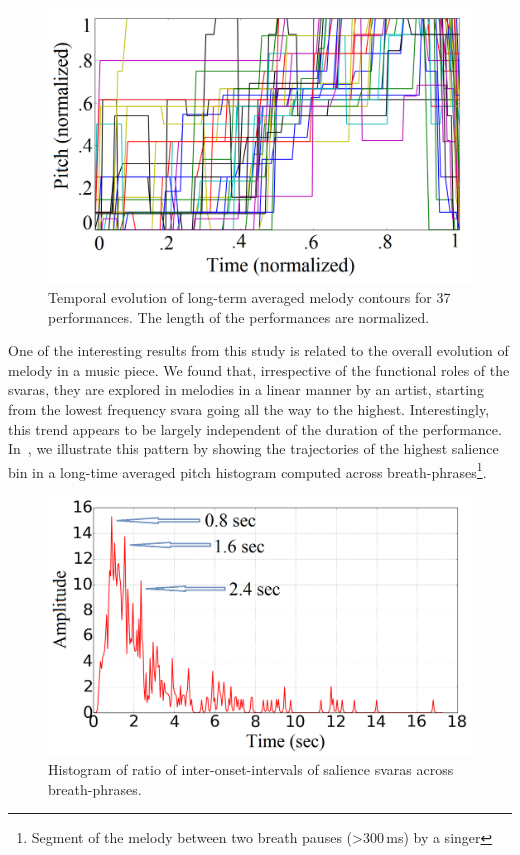 \begin{figure}
	\begin{center}
		\includegraphics[width=\figSizeSixtyFive]{ch08_applications/figures/Fig-5.png}
	\end{center}
	\caption{Temporal evolution of long-term averaged melody contours for 37 performances. The length of the performances are normalized.}
	\label{fig:temporal_evolution}
\end{figure}

One of the interesting results from this study is related to the overall evolution of melody in a music piece. We found that, irrespective of the functional roles of the \glspl{svara}, they are explored in melodies in a linear manner by an artist, starting from the lowest frequency \gls{svara} going all the way to the highest. Interestingly, this trend appears to be largely independent of the duration of the performance. In~, we illustrate this pattern by showing the trajectories of the highest salience bin in a long-time averaged pitch histogram computed across breath-phrases\footnote{Segment of the melody between two breath pauses (>300\,ms) by a singer}. 

\begin{figure}
	\begin{center}
		\includegraphics[width=\figSizeSixtyFive]{ch08_applications/figures/Fig-8.png}
	\end{center}
	\caption{Histogram of ratio of inter-onset-intervals of salience \glspl{svara} across breath-phrases.}
	\label{fig:pulsation_example}
\end{figure}

